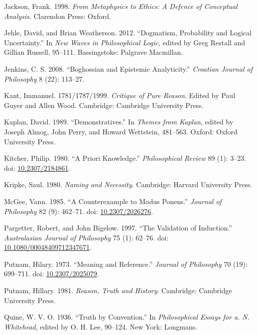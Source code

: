 \documentclass[
  11pt,
  letterpaper,
  DIV=11,
  numbers=noendperiod,
  twoside]{scrartcl}
\newlength{\cslhangindent}
\newenvironment{CSLReferences}[2] %
 {\begin{list}{}{%
  \setlength{\itemindent}{0pt}
  \setlength{\leftmargin}{0pt}
  \setlength{\parsep}{0pt}
  \ifodd #1
   \setlength{\leftmargin}{\cslhangindent}
   \setlength{\itemindent}{-1\cslhangindent}
  \fi
  \setlength{\itemsep}{#2\baselineskip}}}
 {\end{list}}
\begin{document}
\begin{CSLReferences}{1}{0}
Jackson, Frank. 1998. \emph{From Metaphysics to Ethics: A Defence of
Conceptual Analysis}. Clarendon Press: Oxford.

Jehle, David, and Brian Weatherson. 2012. {``Dogmatism, Probability and
Logical Uncertainty.''} In \emph{New Waves in Philosophical Logic},
edited by Greg Restall and Gillian Russell, 95--111. Bassingstoke:
Palgrave Macmillan.

Jenkins, C. S. 2008. {``Boghossian and Epistemic Analyticity.''}
\emph{Croatian Journal of Philosophy} 8 (22): 113--27.

Kant, Immanuel. 1781/1787/1999. \emph{Critique of Pure Reason}. Edited
by Paul Guyer and Allen Wood. Cambridge: Cambridge University Press.

Kaplan, David. 1989. {``Demonstratives.''} In \emph{Themes from Kaplan},
edited by Joseph Almog, John Perry, and Howard Wettstein, 481--563.
Oxford: Oxford University Press.

Kitcher, Philip. 1980. {``A Priori Knowledge.''} \emph{Philosophical
Review} 89 (1): 3--23. doi:
\href{https://doi.org/10.2307/2184861}{10.2307/2184861}.

Kripke, Saul. 1980. \emph{Naming and Necessity}. Cambridge: Harvard
University Press.

McGee, Vann. 1985. {``A Counterexample to Modus Ponens.''} \emph{Journal
of Philosophy} 82 (9): 462--71. doi:
\href{https://doi.org/10.2307/2026276}{10.2307/2026276}.

Pargetter, Robert, and John Bigelow. 1997. {``The Validation of
Induction.''} \emph{Australasian Journal of Philosophy} 75 (1): 62--76.
doi:
\href{https://doi.org/10.1080/00048409712347671}{10.1080/00048409712347671}.

Putnam, Hilary. 1973. {``Meaning and Reference.''} \emph{Journal of
Philosophy} 70 (19): 699--711. doi:
\href{https://doi.org/10.2307/2025079}{10.2307/2025079}.

Putnam, Hillary. 1981. \emph{Reason, Truth and History}. Cambridge:
Cambridge University Press.

Quine, W. V. O. 1936. {``Truth by Convention.''} In \emph{Philosophical
Essays for a. N. Whitehead}, edited by O. H. Lee, 90--124. New York:
Longmans.


\end{CSLReferences}
\end{document}
